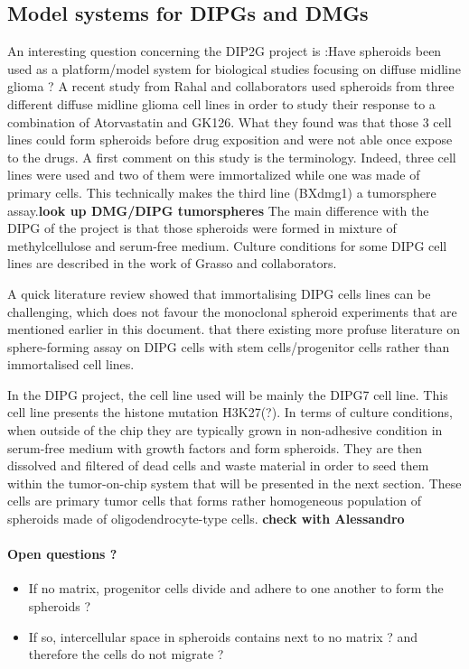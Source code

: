 \documentclass[11pt,a4paper]{article}
\begin{document}
\subsection{Model systems for DIPGs and DMGs}
An interesting question concerning the DIP2G project is :Have spheroids been used as a platform/model system for biological studies focusing on diffuse midline glioma ? A recent study from Rahal and collaborators used spheroids from three different diffuse midline glioma cell lines in order to study their response to a combination of Atorvastatin and GK126.\cite{Rahal2022} What they found was that those 3 cell lines could form spheroids before drug exposition and were not able once expose to the drugs. A first comment on this study is the terminology. Indeed, three cell lines were used and two of them were immortalized while one was made of primary cells. This technically makes the third line (BXdmg1) a tumorsphere assay.\textbf{look up DMG/DIPG tumorspheres} The main difference with the DIPG of the project is that those spheroids were formed in mixture of methylcellulose and serum-free medium. Culture conditions for some DIPG cell lines are described in the work of Grasso and collaborators. \cite{Grasso2015}%

A quick literature review showed that immortalising DIPG cells lines can be challenging, which does not favour the monoclonal spheroid experiments that are mentioned earlier in this document.\cite{Sun2019}\cite{Meel2018} that there existing more profuse literature on sphere-forming assay on DIPG cells with stem cells/progenitor cells rather than immortalised cell lines.

In the DIPG project, the cell line used will be mainly the DIPG7 cell line. This cell line presents the histone mutation H3K27(?). In terms of culture conditions, when outside of the chip they are typically grown in non-adhesive condition in serum-free medium with growth factors and form spheroids. They are then dissolved and filtered of dead cells and waste material in order to seed them within the tumor-on-chip system that will be presented in the next section. These cells are primary tumor cells that forms rather homogeneous population of spheroids made of oligodendrocyte-type cells. \textbf{check with Alessandro} 

\paragraph{Open questions ?}
\begin{itemize}
\item If no matrix, progenitor cells divide and adhere to one another to form the spheroids ?
\item If so, intercellular space in spheroids contains next to no matrix ? and therefore the cells do not migrate ? 
\end{itemize}
\end{document}
